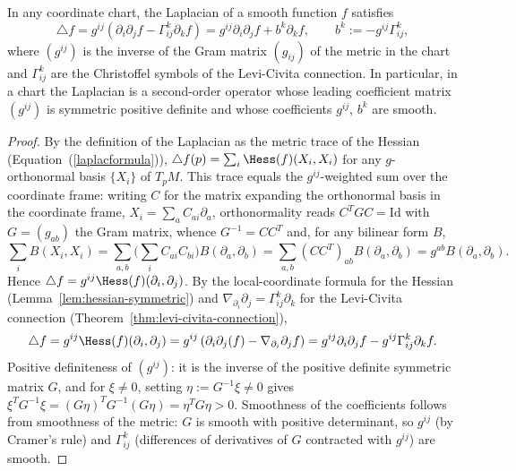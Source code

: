 \begin{lemma}
\label{lem:laplacian-christoffel-formula}
\leanok
In any coordinate chart, the Laplacian of a smooth function $f$
satisfies
\[ \triangle f
   = g^{ij}\left(\partial_i\partial_jf-\Gamma^k_{ij}\partial_kf\right)
   = g^{ij}\partial_i\partial_jf+b^k\partial_kf,
   \qquad b^k:=-g^{ij}\Gamma^k_{ij}, \]
where $(g^{ij})$ is the inverse of the Gram matrix $(g_{ij})$ of the
metric in the chart and $\Gamma^k_{ij}$ are the Christoffel symbols of
the Levi-Civita connection. In particular, in a chart the Laplacian is
a second-order operator whose leading coefficient matrix $(g^{ij})$ is
symmetric positive definite and whose coefficients $g^{ij}$, $b^k$ are
smooth.
\end{lemma}

\begin{proof}
\leanok
By the definition of the Laplacian as the metric trace of the Hessian
(Equation~(\ref{laplacformula})), $\triangle f(p)=\sum_i
\Hess(f)(X_i,X_i)$ for any $g$-orthonormal basis $\{X_i\}$ of $T_pM$.
This trace equals the $g^{ij}$-weighted sum over the coordinate frame:
writing $C$ for the matrix expanding the orthonormal basis in the
coordinate frame, $X_i=\sum_aC_{ai}\partial_a$, orthonormality reads
$C^TGC=\mathrm{Id}$ with $G=(g_{ab})$ the Gram matrix, whence
$G^{-1}=CC^T$ and, for any bilinear form $B$,
$$\sum_iB(X_i,X_i)=\sum_{a,b}\Big(\sum_iC_{ai}C_{bi}\Big)B(\partial_a,\partial_b)
=\sum_{a,b}(CC^T)_{ab}B(\partial_a,\partial_b)
=g^{ab}B(\partial_a,\partial_b).$$
Hence $\triangle f=g^{ij}\Hess(f)(\partial_i,\partial_j)$. By the
local-coordinate formula for the Hessian
(Lemma~\ref{lem:hessian-symmetric}) and
$\nabla_{\partial_i}\partial_j=\Gamma^k_{ij}\partial_k$ for the
Levi-Civita connection (Theorem~\ref{thm:levi-civita-connection}),
$$\triangle
f=g^{ij}\Hess(f)(\partial_i,\partial_j)=g^{ij}\left(\partial_i\partial_j(f)-
\nabla_{\partial_i}\partial_jf\right)
=g^{ij}\partial_i\partial_jf-g^{ij}\Gamma_{ij}^k\partial_kf.$$
Positive definiteness of $(g^{ij})$: it is the inverse of the positive
definite symmetric matrix $G$, and for $\xi\neq0$, setting
$\eta:=G^{-1}\xi\neq0$ gives
$\xi^{T}G^{-1}\xi=(G\eta)^{T}G^{-1}(G\eta)=\eta^{T}G\eta>0$.
Smoothness of the coefficients follows from smoothness of the metric:
$G$ is smooth with positive determinant, so $g^{ij}$ (by Cramer's
rule) and $\Gamma^k_{ij}$ (differences of derivatives of $G$
contracted with $g^{ij}$) are smooth.
\end{proof}

